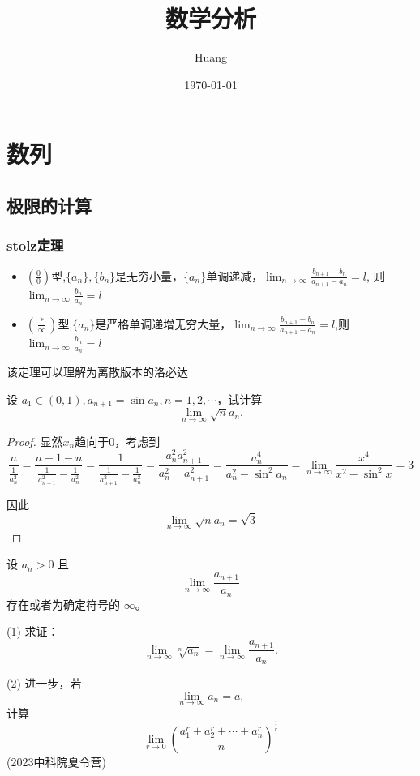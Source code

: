 \documentclass[lang=cn,10pt,thmcnt=section]{elegantbook}
\title{数学分析}
\author{Huang}
\date{\today}
\begin{document}
	
	\maketitle
	\frontmatter
	
	\tableofcontents
	
	\mainmatter
	\chapter{数列}
	\section{极限的计算}
	\subsection{stolz定理}
	\begin{theorem}[Stolz]
		\begin{itemize}
			\item $(\frac{0}{0})$型,$\{ a_n\} ,\{ b_n\}$是无穷小量，$\{ a_n\}$单调递减，$\lim_{n \to \infty}  \frac{b_{n+1}-b_n}{a_{n+1}-a_n}=l$,	则$\lim_{n \to \infty}  \frac{b_n}{a_n}=l$
			\item $(\frac{*}{\infty})$型,$\{ a_n\} $是严格单调递增无穷大量，$\lim_{n \to \infty}  \frac{b_{n+1}-b_n}{a_{n+1}-a_n}=l$,则$\lim_{n \to \infty}  
			\frac{b_n}{a_n}=l$
		\end{itemize}
	\end{theorem}
	\begin{remark}
		该定理可以理解为离散版本的洛必达
	\end{remark}
	\begin{example}
		设 $a_1 \in (0,1), a_{n+1} = \sin a_n, n = 1,2,\cdots$，试计算  
\[ \lim_{n \to \infty} \sqrt{n }a_n. \]
	\end{example}
	\begin{proof}

		显然$x_n$趋向于0，考虑到$$\frac{n}{\frac{1}{a_n^2}}=\frac{n+1-n}{\frac{1}{a_{n+1}^2}-\frac{1}{a_n^2}}=\frac{1}{\frac{1}{a_{n+1}^2}-\frac{1}{a_n^2}}=\frac{a_n^2 a_{n+1}^2}{a_n^2 - a_{n+1}^2}=\frac{a_n^4}{a_n^2 - \sin^2 a_n}=\lim_{n \to \infty} \frac{x^4}{x^2 -\sin^2x}=3$$

		因此$$\lim_{n \to \infty} \sqrt{n }a_n=\sqrt{3}$$
	\end{proof}
	\begin{example}
		设 $a_n > 0$ 且  
\[ \lim_{n \to \infty} \frac{a_{n+1}}{a_n} \]  
存在或者为确定符号的 $\infty$。

(1) 求证：  
\[ \lim_{n \to \infty} \sqrt[n]{a_n} = \lim_{n \to \infty} \frac{a_{n+1}}{a_n}. \]

(2) 进一步，若  
\[ \lim_{n \to \infty} a_n = a, \]  
计算  
\[ \lim_{r \to 0} \left( \frac{a_1^r + a_2^r + \cdots + a_n^r}{n} \right)^{\frac{1}{r}} \]  
(2023中科院夏令营)
	\end{example}
\end{document}
